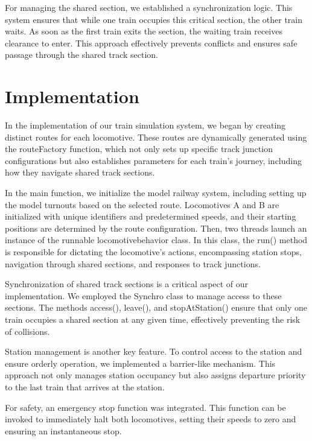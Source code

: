 \documentclass{article}
\begin{document}
For managing the shared section, we established a synchronization logic. This system ensures that while one train occupies this critical section, the other train waits. As soon as the first train exits the section, the waiting train receives clearance to enter. This approach effectively prevents conflicts and ensures safe passage through the shared track section.

    \section{Implementation}

    In the implementation of our train simulation system, we began by creating distinct routes for each locomotive. These routes are dynamically generated using the routeFactory function, which not only sets up specific track junction configurations but also establishes parameters for each train's journey, including how they navigate shared track sections.

    In the main function, we initialize the model railway system, including setting up the model turnouts based on the selected route. Locomotives A and B are initialized with unique identifiers and predetermined speeds, and their starting positions are determined by the route configuration. Then, two threads launch an instance of the runnable locomotivebehavior class. In this class, the run() method is responsible for dictating the locomotive's actions, encompassing station stops, navigation through shared sections, and responses to track junctions.

    Synchronization of shared track sections is a critical aspect of our implementation. We employed the Synchro class to manage access to these sections. The methods access(), leave(), and stopAtStation() ensure that only one train occupies a shared section at any given time, effectively preventing the risk of collisions.

    Station management is another key feature. To control access to the station and ensure orderly operation, we implemented a barrier-like mechanism. This approach not only manages station occupancy but also assigns departure priority to the last train that arrives at the station.

    For safety, an emergency stop function was integrated. This function can be invoked to immediately halt both locomotives, setting their speeds to zero and ensuring an instantaneous stop.
\end{document}
